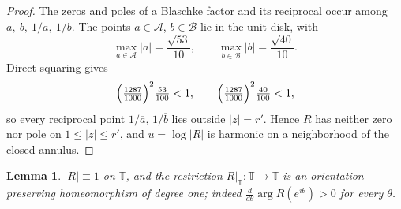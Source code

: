 \documentclass[11pt,reqno]{amsart}
\newtheorem{lemma}[theorem]{Lemma}
\theoremstyle{definition}
\theoremstyle{remark}
\begin{document}
\begin{proof}
The zeros and poles of a Blaschke factor and its reciprocal occur among \(a,\ b,\ 1/\overline a,\ 1/\overline b\). The points \(a\in\mathcal A\), \(b\in\mathcal B\) lie in the unit disk, with
\[ \max_{a\in\mathcal A}|a|=\frac{\sqrt{53}}{10},\qquad \max_{b\in\mathcal B}|b|=\frac{\sqrt{40}}{10}. \]
Direct squaring gives
\[ \Bigl(\tfrac{1287}{1000}\Bigr)^2\tfrac{53}{100}<1,\qquad \Bigl(\tfrac{1287}{1000}\Bigr)^2\tfrac{40}{100}<1, \]
so every reciprocal point \(1/\overline a\), \(1/\overline b\) lies outside \(|z|=r'\). Hence \(R\) has neither zero nor pole on \(1\le|z|\le r'\), and \(u=\log|R|\) is harmonic on a neighborhood of the closed annulus.
\end{proof}
\begin{lemma}\label{lem:circle-homeo}
\(|R|\equiv1\) on \(\mathbb T\), and the restriction \(R|_{\mathbb T}:\mathbb T\to\mathbb T\) is an orientation-preserving homeomorphism of degree one; indeed \(\frac{d}{d\theta}\arg R(e^{i\theta})>0\) for every \(\theta\).
\end{lemma}
\end{document}
